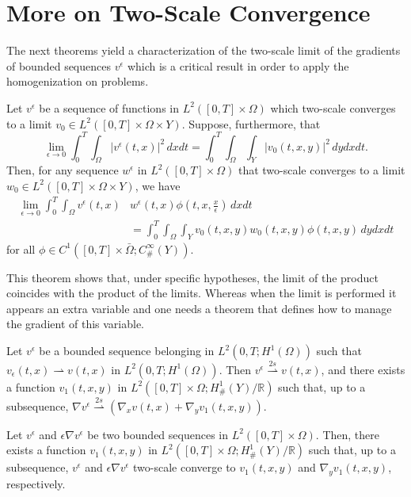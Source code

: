 \section{More on Two-Scale Convergence}
The next theorems yield a characterization of the two-scale limit of the gradients of bounded sequences $v^{\epsilon}$ which is a critical result in order to apply the homogenization on problems.
\begin{theorem}
Let $v^{\epsilon}$ be a sequence of functions in $L^{2}([0, T] \times \Omega)$ which two-scale converges to a limit $v_{0} \in L^{2}([0, T] \times \Omega \times Y)$. Suppose, furthermore, that
$$
\lim _{\epsilon \rightarrow 0} \int_{0}^{T} \int_{\Omega}\left|v^{\epsilon}(t, x)\right|^{2} \, dxdt=\int_{0}^{T} \int_{\Omega} \int_{Y}\left|v_{0}(t, x, y)\right|^{2} \, dy dx dt.
$$
Then, for any sequence $w^{\epsilon}$ in $L^{2}([0, T] \times \Omega)$ that two-scale converges to a limit $w_{0} \in L^{2}([0, T] \times \Omega \times Y)$, we have
$$
\begin{aligned}
\lim _{\epsilon \rightarrow 0} \int_{0}^{T} \int_{\Omega} v^{\epsilon}(t, x) & w^{\epsilon}(t, x) \phi\left(t, x, \frac{x}{\epsilon}\right) \, dxdt \\
&=\int_{0}^{T} \int_{\Omega} \int_{Y} v_{0}(t, x, y) w_{0}(t, x, y) \phi(t, x, y) \, dy dx dt
\end{aligned}
$$for all $\phi \in C^{1}\left([0, T] \times \bar{\Omega} ; C_{\#}^{\infty}(Y)\right)$.
\label{thm 7.2}\end{theorem}
This theorem shows that, under specific hypotheses, the limit of the product coincides with the product of the limits. Whereas when the limit is performed it appears an extra variable and one needs a theorem that defines how to manage the gradient of this variable.
\begin{theorem}
Let $v^{\epsilon}$ be a bounded sequence belonging in $L^{2}\left(0, T ; H^{1}(\Omega)\right)$ such that $v_{\epsilon}(t,x)\rightharpoonup v(t,x)$  in $L^{2}\left(0, T ; H^{1}(\Omega)\right)$. Then $v^{\epsilon} \overset{2s}{\rightharpoonup} v(t, x)$, and there exists a function $v_{1}(t, x, y)$ in $L^{2}\left([0, T] \times \Omega ; H_{\#}^{1}(Y) / \mathbb{R}\right)$ such that, up to a subsequence, $\nabla v^{\epsilon}  \overset{2s}{\rightharpoonup} \left(\nabla_{x} v(t, x)+\nabla_{y} v_{1}(t, x, y)\right)$. 
\label{thm 7.3}\end{theorem}
\begin{theorem} Let $v^{\epsilon}$ and $\epsilon \nabla v^{\epsilon}$ be two bounded sequences in $L^{2}([0, T] \times \Omega)$. Then, there exists a function $v_{1}(t, x, y)$ in $L^{2}\left([0, T] \times \Omega ; H_{\#}^{1}(Y) / \mathbb{R}\right)$ such that, up to a subsequence, $v^{\epsilon}$ and $\epsilon \nabla v^{\epsilon}$ two-scale converge to $v_{1}(t, x, y)$ and $\nabla_{y} v_{1}(t, x, y)$, respectively.
\label{theorem 7.4}\end{theorem}
